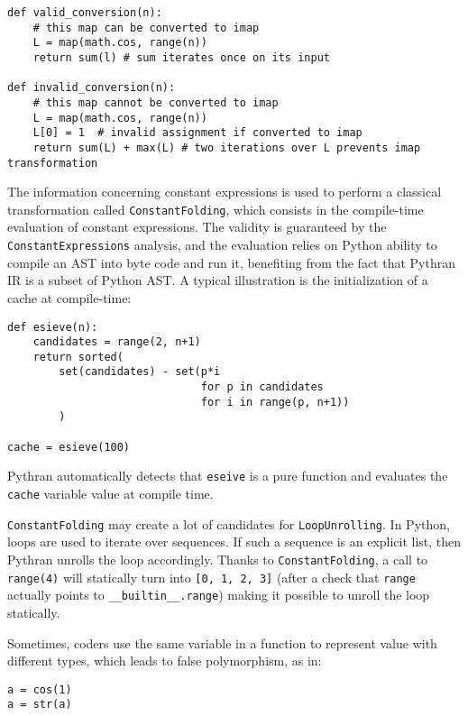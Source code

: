 \documentclass[10pt, onecolumn, preprint]{sigplanconf}
\begin{document}
\begin{lstlisting}
def valid_conversion(n):
    # this map can be converted to imap
    L = map(math.cos, range(n))
    return sum(l) # sum iterates once on its input

def invalid_conversion(n):
    # this map cannot be converted to imap
    L = map(math.cos, range(n))
    L[0] = 1  # invalid assignment if converted to imap
    return sum(L) + max(L) # two iterations over L prevents imap transformation
\end{lstlisting}

The information concerning constant expressions is used to perform a classical
transformation called \texttt{ConstantFolding}, which consists in the compile-time
evaluation of constant expressions. The validity is guaranteed by the
\texttt{ConstantExpressions} analysis, and the evaluation relies on Python ability to
compile an AST into byte code and run it, benefiting from the fact that Pythran
IR is a subset of Python AST. A typical illustration is the initialization of a
cache at compile-time:

\begin{lstlisting}
def esieve(n):
    candidates = range(2, n+1)
    return sorted(
        set(candidates) - set(p*i
                              for p in candidates
                              for i in range(p, n+1))
        )

cache = esieve(100)
\end{lstlisting}

Pythran automatically detects that \texttt{eseive} is a pure function and evaluates
the \texttt{cache} variable value at compile time.

\texttt{ConstantFolding} may create a lot of candidates for \texttt{LoopUnrolling}. In Python, loops are used to iterate over sequences. If such a sequence is an explicit list, then Pythran unrolls the loop accordingly. Thanks to \texttt{ConstantFolding}, a call to \texttt{range(4)} will statically turn into \texttt{[0, 1, 2, 3]} (after a check that \texttt{range} actually points to \texttt{\_\_builtin\_\_.range}) making it possible to unroll the loop statically.

Sometimes, coders use the same variable in a function to represent value with
different types, which leads to false polymorphism, as in:


\begin{lstlisting}
a = cos(1)
a = str(a)
\end{lstlisting}
\end{document}
